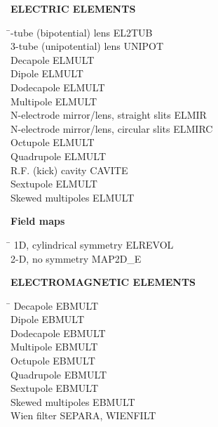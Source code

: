 \noindent\textbf{ELECTRIC ELEMENTS}  
\smallskip

\begin{tabbing}
\hspace*{7cm} \= -tube (bipotential) lens \> EL2TUB \\
  3-tube (unipotential) lens \> UNIPOT \\
  Decapole                \> ELMULT \\
  Dipole                  \> ELMULT \\
  Dodecapole              \> ELMULT \\
  Multipole               \> ELMULT \\
  N-electrode mirror/lens, straight slits            \> ELMIR \\
  N-electrode mirror/lens, circular slits            \> ELMIRC \\
  Octupole                \> ELMULT \\
  Quadrupole              \> ELMULT \\
  R.F. (kick) cavity             \> CAVITE \\
  Sextupole               \> ELMULT \\
  Skewed multipoles       \> ELMULT 
\end{tabbing}
\bigskip


\newpage


\noindent\textbf{Field maps} 
\smallskip

\begin{tabbing}
\hspace*{7cm} \= \kill
 1D, cylindrical symmetry  \> ELREVOL  \\
  2-D, no symmetry          \> MAP2D\_E 
\end{tabbing}


\noindent\textbf{ELECTROMAGNETIC ELEMENTS}  
\smallskip

\begin{tabbing}
\hspace*{7cm} \= \kill
  Decapole                \> EBMULT \\
  Dipole                  \> EBMULT \\
  Dodecapole              \> EBMULT \\
  Multipole               \> EBMULT \\
  Octupole                \> EBMULT \\
  Quadrupole              \> EBMULT \\
  Sextupole               \> EBMULT \\
  Skewed multipoles       \> EBMULT \\
  Wien filter             \> SEPARA, WIENFILT 
\end{tabbing} 

